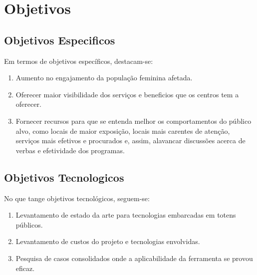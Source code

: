 \section{Objetivos}
\vspace*{1cm}
\subsection{Objetivos Especificos}
Em termos de objetivos específicos, destacam-se:
\begin{enumerate}
\item Aumento no engajamento da população feminina afetada.
\item Oferecer maior visibilidade dos serviços e beneficios que os centros tem a oferecer.
\item Fornecer recursos para que se entenda melhor os comportamentos do público alvo, como locais de maior exposição, locais mais carentes de atenção, serviços mais efetivos e procurados e, assim, alavancar discussões acerca de verbas e efetividade dos programas.
\end{enumerate}
\subsection{Objetivos Tecnologicos}
No que tange objetivos tecnológicos, seguem-se:
\begin{enumerate}
\item Levantamento de estado da arte para tecnologias embarcadas em totens públicos.
\item Levantamento de custos do projeto e tecnologias envolvidas.
\item Pesquisa de casos consolidados onde a aplicabilidade da ferramenta se provou eficaz.
\end{enumerate}
\newpage 